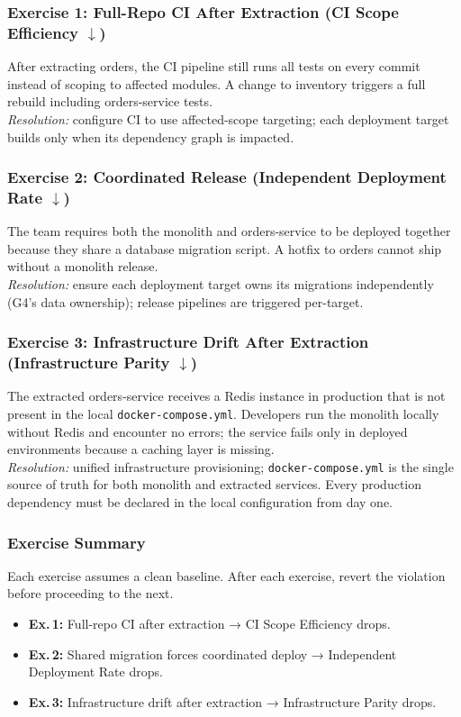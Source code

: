 \subsubsection*{Exercise 1: Full-Repo CI After Extraction (CI Scope Efficiency $\downarrow$)}

After extracting orders, the CI pipeline still runs all tests on every commit instead of scoping to affected modules. A change to inventory triggers a full rebuild including orders-service tests.\\
\emph{Resolution:} configure CI to use affected-scope targeting; each deployment target builds only when its dependency graph is impacted.

\subsubsection*{Exercise 2: Coordinated Release (Independent Deployment Rate $\downarrow$)}

The team requires both the monolith and orders-service to be deployed together because they share a database migration script. A hotfix to orders cannot ship without a monolith release.\\
\emph{Resolution:} ensure each deployment target owns its migrations independently (G4's data ownership); release pipelines are triggered per-target.

\subsubsection*{Exercise 3: Infrastructure Drift After Extraction (Infrastructure Parity $\downarrow$)}

The extracted orders-service receives a Redis instance in production that is not present in the local \texttt{docker-compose.yml}. Developers run the monolith locally without Redis and encounter no errors; the service fails only in deployed environments because a caching layer is missing.\\
\emph{Resolution:} unified infrastructure provisioning; \texttt{docker-compose.yml} is the single source of truth for both monolith and extracted services. Every production dependency must be declared in the local configuration from day one.

\subsubsection*{Exercise Summary}
Each exercise assumes a clean baseline. After each exercise, revert the violation before proceeding to the next.
\begin{itemize}[itemsep=2pt,topsep=2pt]
  \item \textbf{Ex.\,1:} Full-repo CI after extraction → CI Scope Efficiency drops.
  \item \textbf{Ex.\,2:} Shared migration forces coordinated deploy → Independent Deployment Rate drops.
  \item \textbf{Ex.\,3:} Infrastructure drift after extraction → Infrastructure Parity drops.
\end{itemize}

